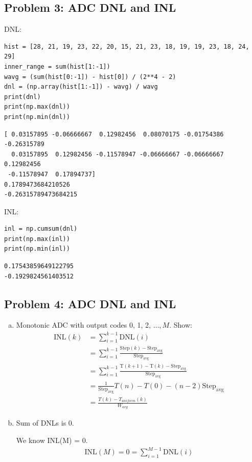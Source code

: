 \documentclass[11pt]{article}
\begin{document}
\subsection*{Problem 3: ADC DNL and INL}
DNL:
\begin{verbatim}
hist = [28, 21, 19, 23, 22, 20, 15, 21, 23, 18, 19, 19, 23, 18, 24, 29]
inner_range = sum(hist[1:-1])
wavg = (sum(hist[0:-1]) - hist[0]) / (2**4 - 2)
dnl = (np.array(hist[1:-1]) - wavg) / wavg
print(dnl)
print(np.max(dnl))
print(np.min(dnl))
\end{verbatim}
\begin{verbatim}
[ 0.03157895 -0.06666667  0.12982456  0.08070175 -0.01754386 -0.26315789
  0.03157895  0.12982456 -0.11578947 -0.06666667 -0.06666667  0.12982456
 -0.11578947  0.17894737]
0.1789473684210526
-0.26315789473684215
\end{verbatim}

INL:
\begin{verbatim}
inl = np.cumsum(dnl)
print(np.max(inl))
print(np.min(inl))
\end{verbatim}
\begin{verbatim}
0.17543859649122795
-0.1929824561403512
\end{verbatim}

\subsection*{Problem 4: ADC DNL and INL}
\begin{enumerate}[a)]
    \item Monotonic ADC with output codes 0, 1, 2, $\dots, M$. Show:
        \begin{align*}
            \text{INL}(k) &= \sum_{i=1}^{k-1} \text{DNL}(i) \\
            &= \sum_{i=1}^{k-1} \frac{\text{Step}(k) - \text{Step}_{\text{avg}}}{\text{Step}_{\text{avg}}} \\
            &= \sum_{i=1}^{k-1} \frac{\text{T}(k+1) - \text{T}(k) - \text{Step}_{\text{avg}}}{\text{Step}_{\text{avg}}} \\
            &= \frac{1}{\text{Step}_{\text{avg}}} T(n) - T(0) - (n-2)\text{Step}_{\text{avg}} \\
            &= \frac{T(k) - T_{uniform}(k)}{W_{avg}}
        \end{align*}

    \item Sum of DNLs is 0.

        We know INL(M) = 0.
        \begin{align*}
            \text{INL}(M) = 0 = \sum_{i=1}^{M-1} \text{DNL}(i)
        \end{align*}
\end{enumerate}
\end{document}
